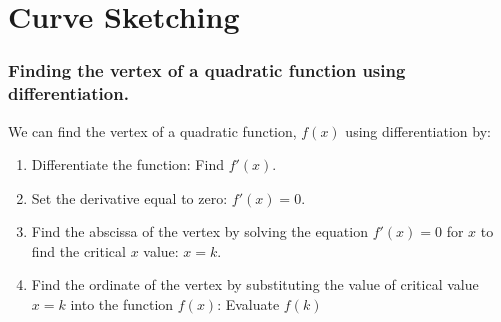 \documentclass[20150903-160354-rs2.2-MarksMathNotebook.tex]{subfiles}
\begin{document}
%
%

\chapter{Curve Sketching}

\subsection{Finding the vertex of a quadratic function using differentiation.}

We can find the vertex of a quadratic function, $f(x)$ using differentiation by:

\begin{enumerate}
\item Differentiate the function: Find $f'(x)$.
\item Set the derivative equal to zero: $f'(x)=0$.
\item Find the abscissa of the vertex by solving the equation $f'(x)=0$ for $x$ to find the critical $x$ value: $x=k$.
\item Find the ordinate of the vertex by substituting the value of critical value $x=k$ into the function $f(x)$: Evaluate $f(k)$
\end{enumerate}
\end{document}
